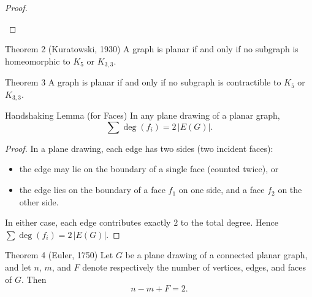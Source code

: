 \begin{proof}
\begin{center}
\end{center}
\end{proof}

\begin{thmbox}{{Theorem 2 (Kuratowski, 1930)}}
A graph is planar if and only if no subgraph is homeomorphic to $K_5$ or $K_{3,3}$.
\end{thmbox}

\begin{thmbox}{Theorem 3}
A graph is planar if and only if no subgraph is contractible to $K_5$ or $K_{3,3}$.
\end{thmbox}

\begin{thmbox}{Handshaking Lemma (for Faces)}
In any plane drawing of a planar graph,
$$\sum \deg(f_i) = 2\,|E(G)|.$$
\end{thmbox}

\begin{proof}
In a plane drawing, each edge has two sides (two incident faces):
\begin{itemize}
  \item the edge may lie on the boundary of a single face (counted twice), or
  \item the edge lies on the boundary of a face $f_1$ on one side, and a face $f_2$ on the other side.
\end{itemize}
In either case, each edge contributes exactly $2$ to the total degree. Hence $\sum \deg(f_i) = 2\,|E(G)|$.
\end{proof}

\begin{thmbox}{{Theorem 4 (Euler, 1750)}}
Let $G$ be a plane drawing of a connected planar graph, and let $n$, $m$, and $F$ denote respectively the number of vertices, edges, and faces of $G$. Then
$$n - m + F = 2.$$
\end{thmbox}

